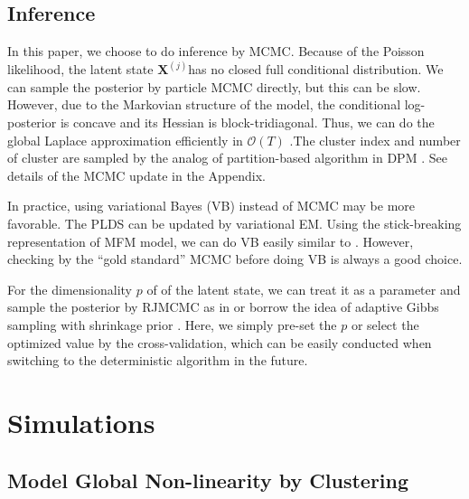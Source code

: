 \documentclass{article}
\begin{document}
	\subsection{Inference}
	
	In this paper, we choose to do inference by MCMC. Because of the Poisson likelihood, the latent state $\bm{X}^{(j)}$has no closed full conditional distribution. We can sample the posterior by particle MCMC directly, but this can be slow. However, due to the Markovian structure of the model, the conditional log-posterior is concave and its Hessian is block-tridiagonal. Thus, we can do the global Laplace approximation efficiently in $\mathcal{O}(T)$ \citep{Paninski2010}.The cluster index and number of cluster are sampled by the analog of partition-based algorithm in DPM \citep{Neal2000}. See details of the MCMC update in the Appendix.
	
	In practice, using variational Bayes (VB) instead of MCMC may be more favorable. The PLDS can be updated by variational EM. Using the stick-breaking representation of MFM model, we can do VB easily similar to \citet{Blei2006}. However, checking by the “gold standard” MCMC before doing VB is always a good choice.
	
	For the dimensionality $p$ of of the latent state, we can treat it as a parameter and sample the posterior by RJMCMC as in \citet{Lopes2004} or borrow the idea of adaptive Gibbs sampling with shrinkage prior \citep{Bhattacharya2011}. Here, we simply pre-set the $p$ or select the optimized value by the cross-validation, which can be easily conducted when switching to the deterministic algorithm in the future. 
	
	\section{Simulations}
	\label{sim}
	
	\subsection{Model Global Non-linearity by Clustering}
	
\end{document}
